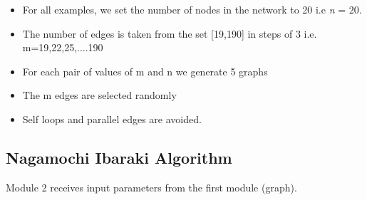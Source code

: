\documentclass[12pt,letterpaper,titlepage,en-US]{article}
\begin{document}
\begin{itemize}
\item For all examples, we set the number of nodes in the network to 20 i.e \textit{n} = 20.

\item The number of edges is taken from the set [19,190] in steps of 3 i.e. m=19,22,25,....190

\item For each pair of values of m and n we generate 5 graphs

\item  The m edges are selected randomly 
\item Self loops and parallel edges are avoided.



\end{itemize}




\subsection{Nagamochi Ibaraki Algorithm}
Module 2 receives input parameters from the first module (graph).
\end{document}
